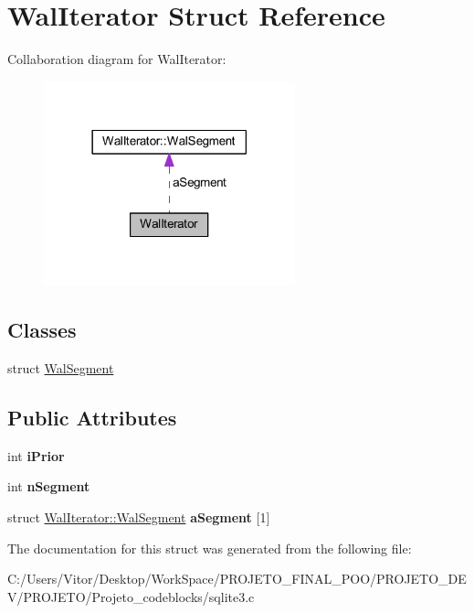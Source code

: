 \hypertarget{struct_wal_iterator}{\section{Wal\-Iterator Struct Reference}
\label{struct_wal_iterator}
}


Collaboration diagram for Wal\-Iterator\-:\nopagebreak
\begin{figure}[H]
\begin{center}
\leavevmode
\includegraphics[width=206pt]{struct_wal_iterator__coll__graph}
\end{center}
\end{figure}
\subsection*{Classes}
\begin{DoxyCompactItemize}
\item 
struct \hyperlink{struct_wal_iterator_1_1_wal_segment}{Wal\-Segment}
\end{DoxyCompactItemize}
\subsection*{Public Attributes}
\begin{DoxyCompactItemize}
\item 
\hypertarget{struct_wal_iterator_a2f906125490dd3e967fc53768b03abbb}{int {\bfseries i\-Prior}}\label{struct_wal_iterator_a2f906125490dd3e967fc53768b03abbb}

\item 
\hypertarget{struct_wal_iterator_ad81bc9447d6043212289d127dc9fdafa}{int {\bfseries n\-Segment}}\label{struct_wal_iterator_ad81bc9447d6043212289d127dc9fdafa}

\item 
\hypertarget{struct_wal_iterator_a6d3fcaaeeca5a0eee46f9fa7c3cb669b}{struct \hyperlink{struct_wal_iterator_1_1_wal_segment}{Wal\-Iterator\-::\-Wal\-Segment} {\bfseries a\-Segment} \mbox{[}1\mbox{]}}\label{struct_wal_iterator_a6d3fcaaeeca5a0eee46f9fa7c3cb669b}

\end{DoxyCompactItemize}


The documentation for this struct was generated from the following file\-:\begin{DoxyCompactItemize}
\item 
C\-:/\-Users/\-Vitor/\-Desktop/\-Work\-Space/\-P\-R\-O\-J\-E\-T\-O\-\_\-\-F\-I\-N\-A\-L\-\_\-\-P\-O\-O/\-P\-R\-O\-J\-E\-T\-O\-\_\-\-D\-E\-V/\-P\-R\-O\-J\-E\-T\-O/\-Projeto\-\_\-codeblocks/sqlite3.\-c\end{DoxyCompactItemize}
